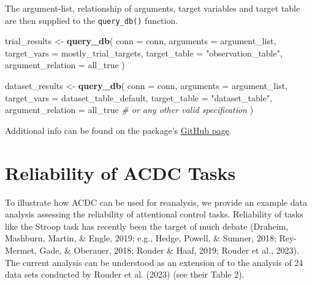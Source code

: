 \documentclass[
  man,floatsintext]{apa6}
\newenvironment{Shaded}{\begin{snugshade}}{\end{snugshade}}
\newcommand{\AttributeTok}[1]{\textcolor[rgb]{0.13,0.29,0.53}{#1}}
\newcommand{\CommentTok}[1]{\textcolor[rgb]{0.56,0.35,0.01}{\textit{#1}}}
\newcommand{\FunctionTok}[1]{\textcolor[rgb]{0.13,0.29,0.53}{\textbf{#1}}}
\newcommand{\NormalTok}[1]{#1}
\newcommand{\OtherTok}[1]{\textcolor[rgb]{0.56,0.35,0.01}{#1}}
\newcommand{\StringTok}[1]{\textcolor[rgb]{0.31,0.60,0.02}{#1}}
\begin{document}
The argument-list, relationship of arguments, target variables and target table are then supplied to the \texttt{query\_db()} function.

\begin{Shaded}
\begin{Highlighting}[]
\NormalTok{trial\_results }\OtherTok{\textless{}{-}} \FunctionTok{query\_db}\NormalTok{(}
  \AttributeTok{conn =}\NormalTok{ conn,}
  \AttributeTok{arguments =}\NormalTok{ argument\_list,}
  \AttributeTok{target\_vars =}\NormalTok{ mostly\_trial\_targets,}
  \AttributeTok{target\_table =} \StringTok{"observation\_table"}\NormalTok{,}
  \AttributeTok{argument\_relation =}\NormalTok{ all\_true}
\NormalTok{)}

\NormalTok{dataset\_results }\OtherTok{\textless{}{-}} \FunctionTok{query\_db}\NormalTok{(}
  \AttributeTok{conn =}\NormalTok{ conn,}
  \AttributeTok{arguments =}\NormalTok{ argument\_list,}
  \AttributeTok{target\_vars =}\NormalTok{ dataset\_table\_default, }
  \AttributeTok{target\_table =} \StringTok{"dataset\_table"}\NormalTok{,}
  \AttributeTok{argument\_relation =}\NormalTok{ all\_true }\CommentTok{\# or any other valid specification}
\NormalTok{)}
\end{Highlighting}
\end{Shaded}

Additional info can be found on the package's \href{https://github.com/SLesche/acdc-query}{GitHub page}.

\hypertarget{reliability-of-acdc-tasks}{%
\section{Reliability of ACDC Tasks}\label{reliability-of-acdc-tasks}}

To illustrate how ACDC can be used for reanalysis, we provide an example data analysis assessing the reliability of attentional control tasks. Reliability of tasks like the Stroop task has recently been the target of much debate (Draheim, Mashburn, Martin, \& Engle, 2019; e.g., Hedge, Powell, \& Sumner, 2018; Rey-Mermet, Gade, \& Oberauer, 2018; Rouder \& Haaf, 2019; Rouder et al., 2023). The current analysis can be understood as an extension of to the analysis of 24 data sets conducted by Rouder et al. (2023) (see their Table 2).
\end{document}
